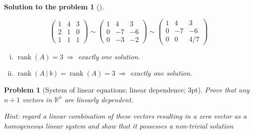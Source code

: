 \documentclass[12pt,a4]{article}
\newtheorem{problem}{Problem}
\newtheorem{solution}{Solution to the problem}
\newcommand\rank{\operatorname{rank}}
\newcommand{\bR}{{\mathbb R}}
\begin{document}
\begin{solution}[]
\begin{enumerate}[(a)]
\[\begin{pmatrix}
1 & 4 & 3 \\ 2 & 1 & 0 \\ 1 & 1 & 1
\end{pmatrix}
\sim
\begin{pmatrix}
1 & 4 & 3 \\ 0 & -7 & -6 \\ 0 & -3 & -2
\end{pmatrix}
\sim
\begin{pmatrix}
1 & 4 & 3 \\ 0 & -7 & -6 \\ 0 & 0 & 4/7
\end{pmatrix}
\]
\begin{enumerate}[(i)]
\item $\rank(A)=3~\Rightarrow$ exactly one solution.
\item $\rank(A~|~b)=\rank(A)=3~\Rightarrow$ exactly one solution.\\
\end{enumerate}
\end{enumerate}
\end{solution}


\begin{problem}[System of linear equations; linear dependence; 3pt]\rm
	Prove that any $n+1$ vectors in $\bR^n$ are linearly dependent.
	
	\small{\textsf{Hint: regard a linear combination of these vectors resulting in a zero vector as a homogeneous linear system and show that it possesses a non-trivial solution}}
\end{problem}
\end{document}
